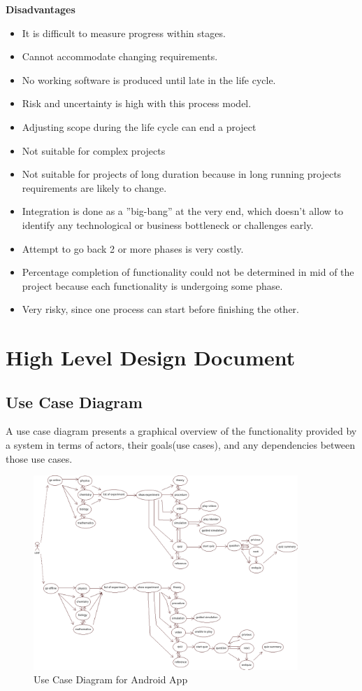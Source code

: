 \documentclass[12pt]{report}
\begin{document}
\textbf{Disadvantages}
\begin{itemize}
\item It is difficult to measure progress within stages. 
\item Cannot accommodate changing requirements. 
\item No working software is produced until late in the life cycle. 
\item Risk and uncertainty is high with this process model. 
\item Adjusting scope during the life cycle can end a project 
\item Not suitable for complex projects 
\item Not suitable for projects of long duration because in long running projects 
requirements are likely to change. 
\item Integration is done as a ''big-bang'' at the very end, which doesn't allow to identify 
any technological or business bottleneck or challenges early. 
\item Attempt to go back 2 or more phases is very costly. 
\item Percentage completion of functionality could not be determined in mid of the project 
because each functionality is undergoing some phase. 
\item Very risky, since one process can start before finishing the other. 
\end{itemize}

\section{High Level Design Document}
\subsection{Use Case Diagram}
A use case diagram presents a graphical overview of the functionality provided by a 
system in terms of actors, their goals(use cases), and any dependencies between those 
use cases. 

\begin{figure}[H]
 \centering
 \includegraphics[width=10cm]{./usecase_app.png}
 \caption{Use Case Diagram for Android App\label{fig:usecase_app}}
\end{figure}
\end{document}
